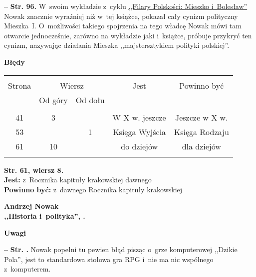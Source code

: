 \documentclass[a4paper,11pt]{article}
\newcommand{\spaceOne}{2em}
\newcommand{\tb}{\textbf}
\newcommand{\noi}{\noindent}
\newcommand{\start}{\noi \tb{--} {}}
\newcommand{\Center}[1]{\begin{center} #1 \end{center}}
\newcommand{\CenterTB}[1]{\Center{\tb{#1}}}
\newcommand{\Str}[1]{\tb{Str. #1.}}
\newcommand{\StrWg}[2]{\tb{Str. #1, wiersz #2.}}
\newcommand{\Jest}{\tb{Jest: }}
\newcommand{\Pow}{\tb{Powinno być: }}
\newcommand{\Work}[1]{ \begin{center} {\large \tb{#1}} \end{center} }
\begin{document}
\start \Str{96} W~swoim wykładzie z~cyklu
\href{https://www.youtube.com/watch?v=QovVLT2fitc}{,,Filary Polskości:
  Mieszko i~Bolesław''} Nowak znacznie wyraźniej niż w~tej książce,
pokazał cały cynizm polityczny Mieszka~I. O~możliwości takiego
spojrzenia na tego władcę Nowak mówi tam otwarcie jednocześnie,
zarówno na wykładzie jaki i~książce, próbuje przykryć ten cynizm,
nazywając działania Mieszka ,,majstersztykiem polityki polskiej''.

\CenterTB{Błędy}
\begin{center}
  \begin{tabular}{|c|c|c|c|c|}
    \hline
    & \multicolumn{2}{c|}{} & & \\
    Strona & \multicolumn{2}{c|}{Wiersz}& Jest & Powinno być \\ \cline{2-3}
    & Od góry & Od dołu &  &  \\ \hline
    & & & & \\
    41 & 3 & & W X w. jeszcze & Jeszcze w X w. \\
    53 & & 1 & Księga Wyjścia & Księga Rodzaju \\
    61 & 10 & & do dziejów & dla dziejów \\
    & & & & \\ \hline
  \end{tabular}
\end{center}
\StrWg{61}{8} \\
\Jest z~Rocznika kapituły krakowskiej dawnego \\
\Pow z~dawnego Rocznika kapituły krakowskiej \\

\vspace{\spaceOne}



\Work{
  Andrzej Nowak \\
  ,,Historia i~polityka'', \cite{Now16}.}


\CenterTB{Uwagi}

\start \Str{} Nowak popełni tu pewien błąd pisząc o~grze komputerowej
,,Dzikie Pola'', jest to standardowa stołowa gra RPG i~nie ma nic
wspólnego z~komputerem.
\end{document}
